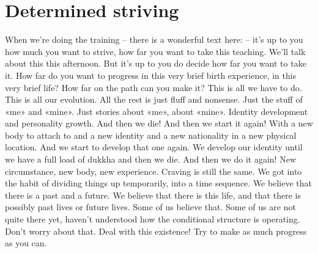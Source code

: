 \documentclass[letterpaper,10pt,english]{sphinxmanual}
\begin{document}
\section{Determined striving}
\label{\detokenize{7-a:determined-striving}}
\sphinxAtStartPar
When we’re doing the training – there is a wonderful text here:
– it’s up to you how much you want to strive, how far you
want to take this teaching. We’ll talk about this this afternoon. But it’s up to
you do decide how far you want to take it. How far do you want to progress
in  this  very  brief  birth  experience,  in  this  very  brief  life?  How  far  on  the
path can you make it? This is all we have to do. This is all our evolution.
All the rest is just fluff and non\sphinxhyphen{}sense. Just the stuff of «me» and «mine».
Just stories about «me», about «mine». Identity development and personality growth. And then we die! And then we start it again! With a new body to
  attach to and a new identity and a new nationality in a new physical location.
And  we  start  to  develop  that  one  again. We  develop  our  identity  until  we
have a full load of dukkha and then we die. And then we do it again! New
circumstance, new body, new experience. Craving is still the same. We got
into the habit of dividing things up temporarily, into a time sequence. We
believe  that  there  is  a  past  and  a  future. We  believe  that  there  is  this  life,
and that there is possibly past lives or future lives. Some of us believe that.
Some of us are not quite there yet, haven’t understood how the conditional
structure is operating. Don’t worry about that. Deal with this existence! Try
to make as much progress as you can.
\end{document}

